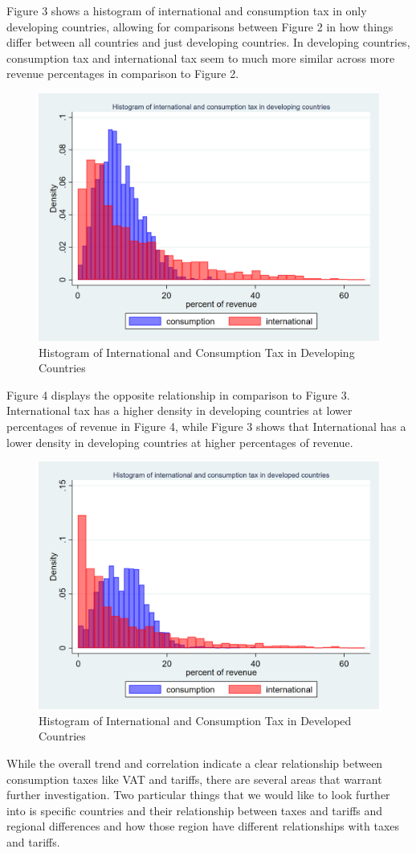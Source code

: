 \documentclass[12pt]{article}
\begin{document}
Figure 3 shows a histogram of international and consumption tax in only developing countries, allowing for comparisons between Figure 2 in how things differ between all countries and just developing countries. In developing countries, consumption tax and international tax seem to much more similar across more revenue percentages in comparison to Figure 2. 

\begin{figure}[h]
    \centering
    \includegraphics[width=0.5\linewidth]{Reproducibility_Package//research_outputs/twowayhistdevelopingintcons.png}
    \caption{Histogram of International and Consumption Tax in Developing Countries}
    \label{fig:enter-label}
\end{figure}

Figure 4 displays the opposite relationship in comparison to Figure 3. International tax has a higher density in developing countries at lower percentages of revenue in Figure 4, while Figure 3 shows that International has a lower density in developing countries at higher percentages of revenue. 

\begin{figure}[h]
    \centering
    \includegraphics[width=0.5\linewidth]{Reproducibility_Package//research_outputs/twowayhistdevelopedintcons.png}
    \caption{Histogram of International and Consumption Tax in Developed Countries}
    \label{fig:enter-label}
\end{figure}

While the overall trend and correlation indicate a clear relationship between consumption taxes like VAT and tariffs, there are several areas that warrant further investigation. Two particular things that we would like to look further into is specific countries and their relationship between taxes and tariffs and regional differences and how those region have different relationships with taxes and tariffs.
\end{document}
